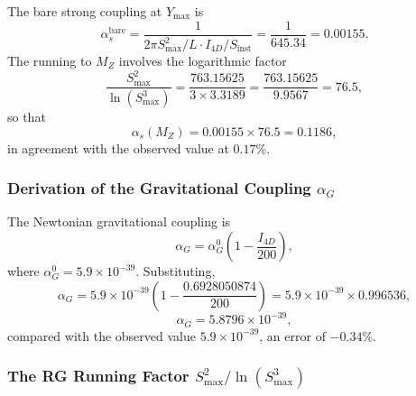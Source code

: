 \documentclass[12pt,oneside,openany]{book}
\begin{document}
The bare strong coupling at $Y_{\max}$ is
\begin{equation}
\alpha_s^{\mathrm{bare}} = \frac{1}{2\pi S_{\max}^2/L \cdot I_{4D}/S_{\mathrm{inst}}} = \frac{1}{645.34} = 0.00155.
\label{eq:alphas-bare}
\end{equation}
The running to $M_Z$ involves the logarithmic factor
\begin{equation}
\frac{S_{\max}^2}{\ln(S_{\max}^3)} = \frac{763.15625}{3 \times 3.3189} = \frac{763.15625}{9.9567} = 76.5,
\label{eq:running-factor}
\end{equation}
so that
\begin{equation}
\alpha_s(M_Z) = 0.00155 \times 76.5 = 0.1186,
\label{eq:alphas-via-factor}
\end{equation}
in agreement with the observed value at $0.17\%$.

\subsubsection{Derivation of the Gravitational Coupling $\alpha_G$}

The Newtonian gravitational coupling is
\begin{equation}
\alpha_G = \alpha_G^0 \left(1 - \frac{I_{4D}}{200}\right),
\label{eq:alphaG-def}
\end{equation}
where $\alpha_G^0 = 5.9 \times 10^{-39}$. Substituting,
\begin{equation}
\alpha_G = 5.9 \times 10^{-39} \left(1 - \frac{0.6928050874}{200}\right) = 5.9 \times 10^{-39} \times 0.996536,
\label{eq:alphaG-num}
\end{equation}
\begin{equation}
\boxed{\alpha_G = 5.8796 \times 10^{-39},}
\label{eq:alphaG-final}
\end{equation}
compared with the observed value $5.9 \times 10^{-39}$, an error of $-0.34\%$.

\subsubsection{The RG Running Factor $S_{\max}^2/\ln(S_{\max}^3)$}
\end{document}
